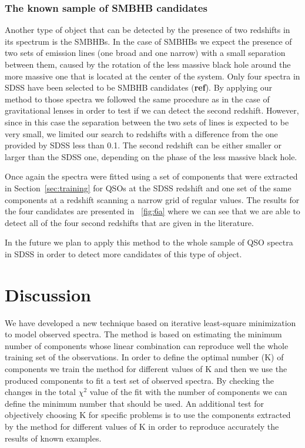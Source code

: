 \documentclass[12pt,preprint]{aastex}
\newcommand{\sectionname}{Section}
\begin{document}
\subsubsection{The known sample of SMBHB candidates}
Another type of object that can be detected by the presence of two
redshifts in its spectrum is the SMBHBs. In the case of SMBHBs we
expect the presence of two sets of emission lines (one broad and one
narrow) with a small separation between them, caused by the rotation
of the less massive black hole around the more massive one that is
located at the center of the system. Only four spectra in SDSS have
been selected to be SMBHB candidates (\textbf{ref}). By applying our
method to those spectra we followed the same procedure as in the case
of gravitational lenses in order to test if we can detect the second
redshift. However, since in this case the separation between the two
sets of lines is expected to be very small, we limited our search to
redshifts with a difference from the one provided by SDSS less than
0.1. The second redshift can be either smaller or larger than the SDSS
one, depending on the phase of the less massive black hole.

Once again the spectra were fitted using a set of components that were
extracted in \sectionname~\ref{sec:training} for QSOs at the SDSS
redshift and one set of the same components at a redshift scanning a
narrow grid of regular values. The results for the four candidates are
presented in \figurename~\ref{fig:6a} where we can see that we are
able to detect all of the four second redshifts that are given in the
literature.

In the future we plan to apply this method to the whole sample of QSO
spectra in SDSS in order to detect more candidates of this type of
object.

\section{Discussion}\label{sec:discussion}
We have developed a new technique based on iterative least-square
minimization to model observed spectra. The method is based on
estimating the minimum number of components whose linear combination
can reproduce well the whole training set of the observations.
In order to define the optimal number (K) of components we train the
method for different values of K and then we use the produced
components to fit a test set of observed spectra. By checking the
changes in the total $\chi^2$ value of the fit with the number of
components we can define the minimum number that should be used. An
additional test for objectively choosing K for specific problems is to
use the components extracted by the method for different values of K
in order to reproduce accurately the results of known examples.
\end{document}

